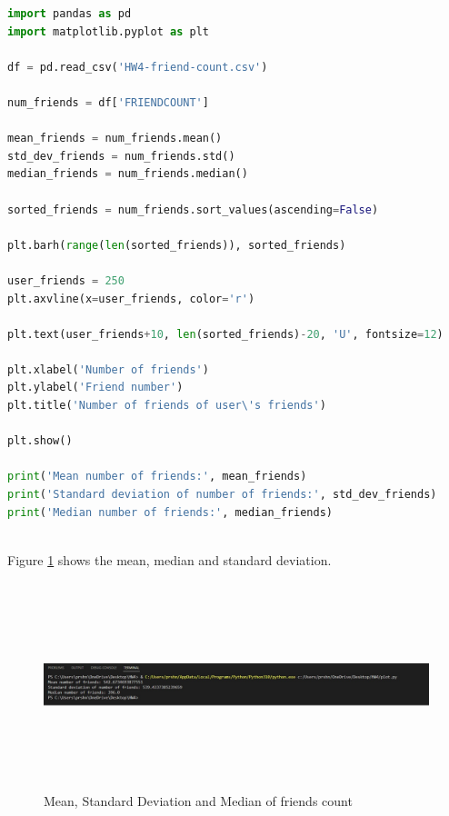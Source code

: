 \documentclass[12pt]{article}
\begin{document}
\begin{lstlisting}[language=Python, caption=Extract the URIs from the .JSON file, label=lst:copy]
import pandas as pd
import matplotlib.pyplot as plt

df = pd.read_csv('HW4-friend-count.csv')

num_friends = df['FRIENDCOUNT']

mean_friends = num_friends.mean()
std_dev_friends = num_friends.std()
median_friends = num_friends.median()

sorted_friends = num_friends.sort_values(ascending=False)

plt.barh(range(len(sorted_friends)), sorted_friends)

user_friends = 250 
plt.axvline(x=user_friends, color='r')

plt.text(user_friends+10, len(sorted_friends)-20, 'U', fontsize=12)

plt.xlabel('Number of friends')
plt.ylabel('Friend number')
plt.title('Number of friends of user\'s friends')

plt.show()

print('Mean number of friends:', mean_friends)
print('Standard deviation of number of friends:', std_dev_friends)
print('Median number of friends:', median_friends)
  
\end{lstlisting}

Figure \ref{fig:1} shows the mean, median and standard deviation.

\begin{figure}[h]
    \centering
    \includegraphics[trim=0 0 0 0, clip, width=1.2\textwidth,height=6cm] {2.jpg}
    \caption{Mean, Standard Deviation and Median of friends count}
    \label{fig:1}
 \end{figure}
 
\end{document}
